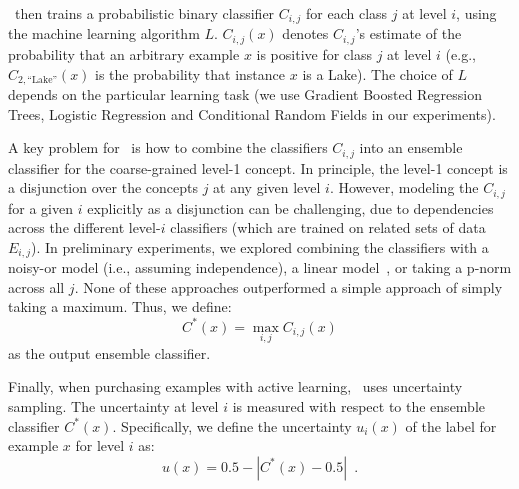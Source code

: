 \documentclass[10pt,conference,compsocconf]{IEEEtran}
\newcommand{\sys}{\Call{Hal}{}} %
\begin{document}
\sys\ then trains a probabilistic binary classifier $C_{i,j}$ for each class $j$ 
at level $i$, using the machine learning algorithm $L$.  $C_{i,j}(x)$ denotes
$C_{i,j}$'s estimate of the probability that an arbitrary example $x$ is positive for class $j$ at level $i$ (e.g.,
$C_{2,\mbox{``Lake''}}(x)$ is the probability that instance $x$ is a Lake).  
The choice of $L$ depends on the particular learning task
(we use Gradient Boosted Regression Trees, Logistic Regression and Conditional Random Fields  in our experiments).

A key problem for \sys\ is how to combine the 
classifiers $C_{i,j}$ into an ensemble classifier for the coarse-grained level-1
concept.  In principle,
the level-1 concept is a disjunction over the concepts $j$ at any given level $i$.
However, modeling the $C_{i,j}$ for a given $i$ explicitly as a disjunction can be
challenging, due to dependencies across the different level-$i$ classifiers (which
are trained on related sets of data $E_{i,j}$).  
In preliminary experiments, we explored
combining the classifiers with a noisy-or model (i.e., assuming independence), a linear model~\cite{Breiman1996},
or taking a p-norm across all $j$.  None of these approaches outperformed a simple approach of
simply taking a maximum.  Thus, we define:
\begin{equation}
\label{eq:maxcombine}
  C^*(x) = \max_{i,j} C_{i,j}(x)
\end{equation}
as the output ensemble classifier. 

Finally, when purchasing examples with active learning, \sys\ uses uncertainty sampling.
The uncertainty at level $i$
is measured with respect to the ensemble classifier $C^*(x)$.  Specifically,
we define the uncertainty $u_i(x)$ of the label for example $x$ for level $i$ as:
\begin{equation}
 u(x) = 0.5 - | C^*(x) -0.5|
\enspace .
\end{equation}
\end{document}
